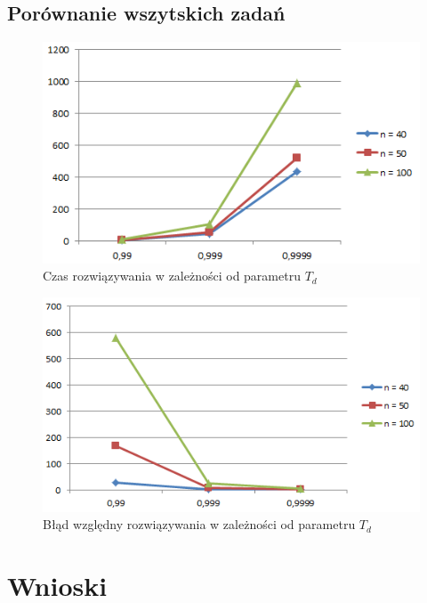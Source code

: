 \documentclass[wide,a4paper,titlepage,12pt] {article}
\begin{document}
\subsection{Porównanie wszytskich zadań}
\begin{figure}[htbp]
  \begin{center}
         \includegraphics[scale=0.8]{complexTime.PNG}
         \caption{Czas rozwiązywania w zależności od parametru $T_d$}
  \end{center}
\end{figure}

\begin{figure}[htbp]
  \begin{center}
         \includegraphics[scale=0.8]{complexDiff.PNG}
         \caption{Błąd względny rozwiązywania w zależności od parametru $T_d$}
  \end{center}
\end{figure}
\newpage
\section{Wnioski}
\end{document}
